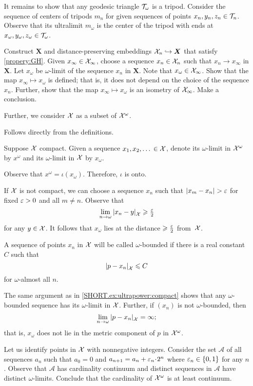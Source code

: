 It remains to show that any geodesic triangle $\mathcal{T}_\omega$ is a tripod.
Consider the sequence of centers of tripods $m_n$ for given sequences of points $x_n,y_n,z_n\in \mathcal{T}_n$.
Observe that its ultralimit $m_\omega$ is the center of the tripod with ends at $x_\omega,y_\omega,z_\omega\in \mathcal{T}_\omega$.

Construct $\bm{X}$ and distance-preserving embeddings $\mathcal{X}_n\hookrightarrow\bm{X}$ that satisfy \ref{propery:GH}.
Given $x_\infty\in \mathcal{X}_\infty$, choose a sequence $x_n\in \mathcal{X}_n$ such that $x_n\to x_\infty$ in $\bm{X}$.
Let $x_\omega$ be $\omega$-limit of the sequence $x_n$ in $\bm{X}$.
Note that $x_\omega\in \mathcal{X}_\infty$.
Show that the map $x_\infty\mapsto x_\omega$ is defined; that is, it does not depend on the choice of the sequence $x_n$.
Further, show that the map $x_\infty\mapsto x_\omega$ is an isometry of $\mathcal{X}_\infty$.
Make a conclusion.

Further, we consider $\mathcal{X}$ as a subset of $\mathcal{X}^\omega$.

 Follows directly from the definitions.

Suppose $\mathcal{X}$ compact.
Given a sequence $x_1,x_2,\dots{}\in\mathcal{X}$, denote its $\omega$-limit in $\mathcal{X}^\omega$ by $x^\omega$ and its $\omega$-limit in $\mathcal{X}$ by $x_\omega$.

Observe that $x^\omega=\iota(x_\omega)$.
Therefore, $\iota$ is onto.

If $\mathcal{X}$ is not compact, we can choose a sequence $x_n$ such that $\dist{x_m}{x_n}{}>\eps$ for fixed $\varepsilon>0$ and all $m\ne n$.
Observe that
\[\lim_{n\to\omega}\dist{x_n}{y}{\spc{X}}\ge \tfrac\eps2\]
for any $y\in\mathcal{X}$.
It follows that $x_\omega$ lies at the distance $\geqslant\tfrac{\varepsilon}2$ from~$\mathcal{X}$.

A sequence of points $x_n$ in $\mathcal{X}$ will be called $\omega$-bounded if there is a real constant $C$ such that
\[\dist{p}{x_n}{\spc{X}}\le C\] 
for $\omega$-almost all $n$.

The same argument as in \ref{SHORT.ex:ultrapower:compact} shows that any $\omega$-bounded sequence has its $\omega$-limit in $\mathcal{X}$.
Further, if $(x_n)$ is not  $\omega$-bounded, then 
\[\lim_{n\to\omega}\dist{p}{x_n}{\spc{X}}=\infty;\]
that is, $x_\omega$ does not lie in the metric component of $p$ in $\mathcal{X}^\omega$.

Let us identify points in $\mathcal{X}$ with nonnegative integers.
Consider the set $\mathcal{A}$ of all sequences $a_n$ such that $a_0=0$ and $a_{n+1}=a_n+\eps_n\cdot 2^n$ where $\varepsilon_n\in\{0,1\}$ for any $n$.
Observe that $\mathcal{A}$ has cardinality continuum and distinct sequences in $\mathcal{A}$ have distinct $\omega$-limits.
Conclude that the cardinality of $\mathcal{X}^\omega$ is at least continuum.

